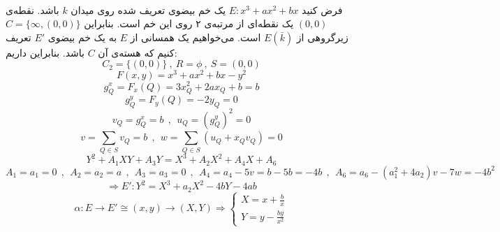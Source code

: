 \\
\example
فرض کنید 
$E:x^3+ax^2+bx$
یک خم بیضوی تعریف شده روی میدان 
$k$
باشد. نقطه‌ی 
$(0,0)$
یک نقطه‌ای از مرتبه‌ی ۲ روی این خم است. بنابراین
$C=\{ \infty , (0,0) \}$
زیرگروهی از
$E(\bar{k})$
است. می‌خواهیم یک همسانی از
$E$
به یک خم بیضوی
$E'$
تعریف کنیم که هسته‌ی آن
$C$
باشد. بنابراین داریم:
$$ C_2 = \{ (0,0) \} ~,~ R = \phi ~,~ S={(0,0)} $$
$$ F(x,y) = x^3+ax^2+bx-y^2 $$
$$ g^x_Q = F_x(Q) = 3x^2_Q + 2ax_Q + b = b $$
$$ g^y_Q  = F_y(Q) = -2y_Q = 0$$
$$ v_Q = g^x_Q = b ~~,~~ u_Q=(g^y_Q)^2 = 0 $$
$$ v = \sum\limits^{}_{Q \in S} v_Q = b ~~,~~ w = \sum\limits^{}_{Q \in S}(u_Q + x_Qv_Q) = 0$$
$$ Y^2+A_1XY+A_3Y = X^3+A_ 2X^2+A_4X+A_6$$
$$ A_1=a_1=0 ~~,~~ A_2=a_2=a ~~,~~ A_3=a_3=0 ~~,~~ A_4=a_4-5v = b-5b = -4b ~~,~~ A_6 = a_6-(a^2_1 + 4a_2)v-7w = -4b^2$$
$$ \Longrightarrow E': Y^2=X^3+a_2X^2-4bY-4ab $$
$$  $$
\begin{equation*}
\alpha : E \longrightarrow E' \cong (x,y) \longrightarrow (X,Y) \Rightarrow
\begin{cases}
X = x + \frac{b}{x} \\
Y = y - \frac{by}{x^2}
\end{cases}
\end{equation*}
